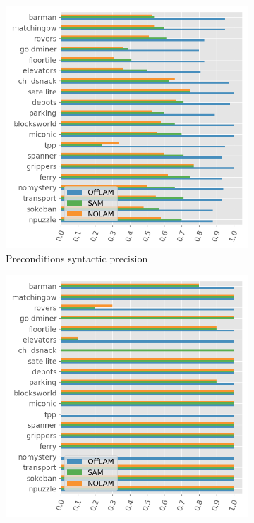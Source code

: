 \begin{figure}[ht]
  \centering

  \begin{subfigure}[b]{\columnwidth}
    \includegraphics[width=\textwidth]{figures/10_traces_mini/syn_precision.png}
    \caption{Preconditions syntactic precision}
    \label{fig:syn-precision}
  \end{subfigure}
  \hfill
  \begin{subfigure}[b]{\columnwidth}
    \includegraphics[width=\textwidth]{figures/10_traces_mini/solving.png}

\end{subfigure}
\end{figure}
